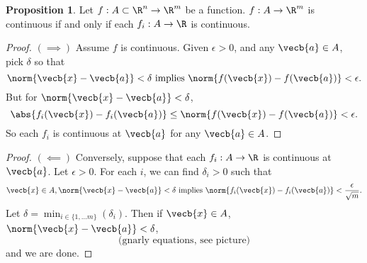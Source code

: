 \documentclass[a5paper]{article}
\theoremstyle{definition}%
\newtheorem{proposition}[theorem]{Proposition}
\numberwithin{exercise}{section}
\theoremstyle{remark}%
\begin{document}
\begin{highlight}
\begin{proposition}
Let $f:A\subset \R^n \to \R^m$ be a function. $f:A\to\R^m$ is continuous if and only if each $f_i:A\to \R$ is continuous. 
\end{proposition}
\end{highlight}
\begin{proof}$(\implies)$
Assume $f$ is continuous. Given $\epsilon>0$, and any $\vecb{a}\in A$, pick $\delta$ so that 
$$\norm{\vecb{x}-\vecb{a}}<\delta \text{ implies } \norm{f(\vecb{x})-f(\vecb{a})}<\epsilon.$$
But for  $\norm{\vecb{x}-\vecb{a}}<\delta$, 
$$\abs{f_i(\vecb{x})-f_i(\vecb{a})}\leq \norm{f(\vecb{x})-f(\vecb{a})}<\epsilon.$$
So each $f_i$ is continuous at $\vecb{a}$ for any $\vecb{a}\in A$. 
\end{proof}
\begin{proof}$(\impliedby)$
Conversely, suppose that each $f_i:A\to \R$ is continuous at $\vecb{a}$. Let $\epsilon>0$. For each $i$, we can find $\delta_i>0$ such that 
$$\vecb{x}\in A, \norm{\vecb{x}-\vecb{a}}<\delta \text{ implies } \norm{f_i(\vecb{x})-f_i(\vecb{a})}<\frac{\epsilon}{\sqrt{m}}.$$
Let $\delta=\min_{i\in \{1, \ldots m\}}(\delta_i)$. Then if $\vecb{x}\in A$, $\norm{\vecb{x}-\vecb{a}}<\delta$, 
$$\text{(gnarly equations, see picture)}$$
and we are done. 
\end{proof}
\end{document}
